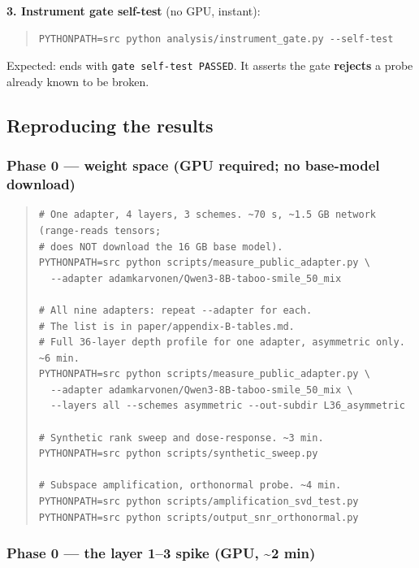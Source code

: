 \textbf{3. Instrument gate self-test} (no GPU, instant):

\begin{quote}\tiny\begin{verbatim}
PYTHONPATH=src python analysis/instrument_gate.py --self-test
\end{verbatim}\end{quote}

Expected: ends with \texttt{gate self-\allowbreak{}test PASSED}. It asserts the gate \textbf{rejects} a probe already known to be broken.

\subsection{Reproducing the results}

\subsubsection{Phase 0 --- weight space (GPU required; no base-model download)}

\begin{quote}\tiny\begin{verbatim}
# One adapter, 4 layers, 3 schemes. ~70 s, ~1.5 GB network (range-reads tensors;
# does NOT download the 16 GB base model).
PYTHONPATH=src python scripts/measure_public_adapter.py \
  --adapter adamkarvonen/Qwen3-8B-taboo-smile_50_mix

# All nine adapters: repeat --adapter for each.
# The list is in paper/appendix-B-tables.md.
# Full 36-layer depth profile for one adapter, asymmetric only. ~6 min.
PYTHONPATH=src python scripts/measure_public_adapter.py \
  --adapter adamkarvonen/Qwen3-8B-taboo-smile_50_mix \
  --layers all --schemes asymmetric --out-subdir L36_asymmetric

# Synthetic rank sweep and dose-response. ~3 min.
PYTHONPATH=src python scripts/synthetic_sweep.py

# Subspace amplification, orthonormal probe. ~4 min.
PYTHONPATH=src python scripts/amplification_svd_test.py
PYTHONPATH=src python scripts/output_snr_orthonormal.py
\end{verbatim}\end{quote}

\subsubsection{Phase 0 --- the layer 1--3 spike (GPU, \textasciitilde{}2 min)}

